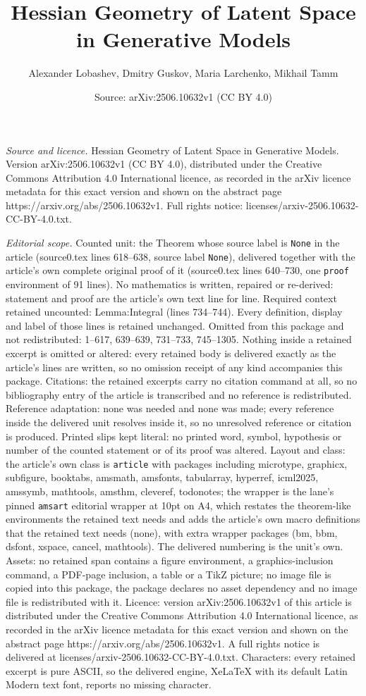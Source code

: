 \documentclass[10pt,a4paper]{amsart}
\title[Hessian Geometry of Latent Space in Generative Models]{Hessian Geometry of Latent Space in Generative Models}
\author{Alexander Lobashev, Dmitry Guskov, Maria Larchenko, Mikhail Tamm}
\date{Source: arXiv:2506.10632v1 (CC BY 4.0)}
\begin{document}
\maketitle

\noindent\emph{Source and licence.} Hessian Geometry of Latent Space in Generative Models. Version arXiv:2506.10632v1 (CC BY 4.0), distributed under the Creative Commons Attribution 4.0 International licence, as recorded in the arXiv licence metadata for this exact version and shown on the abstract page https://arxiv.org/abs/2506.10632v1. Full rights notice: licenses/arxiv-2506.10632-CC-BY-4.0.txt.\par\smallskip

\noindent\textit{Editorial scope.} Counted unit: the Theorem whose source label is \texttt{None} in the article (source0.tex lines 618--638, source label \texttt{None}), delivered together with the article's own complete original proof of it (source0.tex lines 640--730, one \texttt{proof} environment of 91 lines). No mathematics is written, repaired or re-derived: statement and proof are the article's own text line for line. Required context retained uncounted: Lemma:Integral (lines 734--744). Every definition, display and label of those lines is retained unchanged. Omitted from this package and not redistributed: 1--617, 639--639, 731--733, 745--1305. Nothing inside a retained excerpt is omitted or altered: every retained body is delivered exactly as the article's lines are written, so no omission receipt of any kind accompanies this package. Citations: the retained excerpts carry no citation command at all, so no bibliography entry of the article is transcribed and no reference is redistributed. Reference adaptation: none was needed and none was made; every reference inside the delivered unit resolves inside it, so no unresolved reference or citation is produced. Printed slips kept literal: no printed word, symbol, hypothesis or number of the counted statement or of its proof was altered. Layout and class: the article's own class is \texttt{article} with packages including microtype, graphicx, subfigure, booktabs, amsmath, amsfonts, tabularray, hyperref, icml2025, amssymb, mathtools, amsthm, cleveref, todonotes; the wrapper is the lane's pinned \texttt{amsart} editorial wrapper at 10pt on A4, which restates the theorem-like environments the retained text needs and adds the article's own macro definitions that the retained text needs (none), with extra wrapper packages (bm, bbm, dsfont, xspace, cancel, mathtools). The delivered numbering is the unit's own. Assets: no retained span contains a figure environment, a graphics-inclusion command, a PDF-page inclusion, a table or a TikZ picture; no image file is copied into this package, the package declares no asset dependency and no image file is redistributed with it. Licence: version arXiv:2506.10632v1 of this article is distributed under the Creative Commons Attribution 4.0 International licence, as recorded in the arXiv licence metadata for this exact version and shown on the abstract page https://arxiv.org/abs/2506.10632v1. A full rights notice is delivered at licenses/arxiv-2506.10632-CC-BY-4.0.txt. Characters: every retained excerpt is pure ASCII, so the delivered engine, XeLaTeX with its default Latin Modern text font, reports no missing character.
\end{document}
